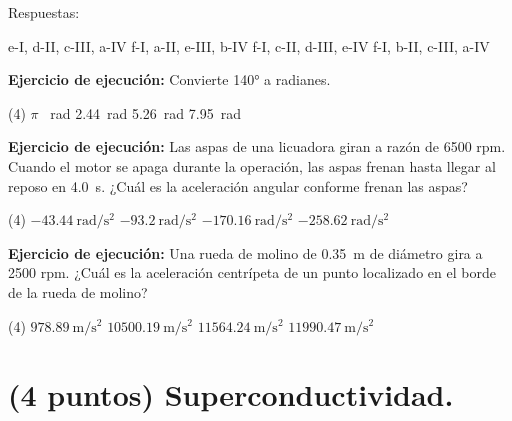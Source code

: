 \documentclass[12pt, letter]{exam}
\begin{document}
\begin{questions}
    \vspace*{0.25cm}
    Respuestas:
    \begin{multicols}{2}
    \begin{tasks}
        \task e-I, d-II, c-III, a-IV
        \task f-I, a-II, e-III, b-IV
        \task f-I, c-II, d-III, e-IV
        \task f-I, b-II, c-III, a-IV
    \end{tasks}
    \end{multicols}
    \question \label{Ejercicio_01} \textbf{Ejercicio de ejecución: } Convierte \ang{140} a radianes.
    \begin{tasks}(4)
        \task $\pi$ \, \unit{\radian}
        \task \SI{2.44}{\radian}
        \task \SI{5.26}{\radian}
        \task \SI{7.95}{\radian}
    \end{tasks}
    \question \label{Ejercicio_02} \textbf{Ejercicio de ejecución: } Las aspas de una licuadora giran a razón de \num{6500} rpm. Cuando el motor se apaga durante la operación, las aspas frenan hasta llegar al reposo en \SI{4.0}{\second}. ¿Cuál es la aceleración angular conforme frenan las aspas?
    \begin{tasks}(4)
        \task $\displaystyle - \SI{43.44}{\radian\per\square\second}$
        \task $\displaystyle - \SI{93.2}{\radian\per\square\second}$
        \task $\displaystyle - \SI{170.16}{\radian\per\square\second}$
        \task $\displaystyle - \SI{258.62}{\radian\per\square\second}$
    \end{tasks}
    \question \label{Ejercicio_03} \textbf{Ejercicio de ejecución: } Una rueda de molino de \SI{0.35}{\meter} de diámetro gira a \num{2500} rpm. ¿Cuál es la aceleración centrípeta de un punto localizado en el borde de la rueda de molino?
    \begin{tasks}(4)
        \task $\displaystyle \SI[per-mode=fraction]{978.89}{\meter\per\square\second}$
        \task $\displaystyle \SI[per-mode=fraction]{10500.19}{\meter\per\square\second}$
        \task $\displaystyle \SI[per-mode=fraction]{11564.24}{\meter\per\square\second}$
        \task $\displaystyle \SI[per-mode=fraction]{11990.47}{\meter\per\square\second}$
    \end{tasks}

    \section{(4 puntos) Superconductividad.}


\end{questions}
\end{document}
